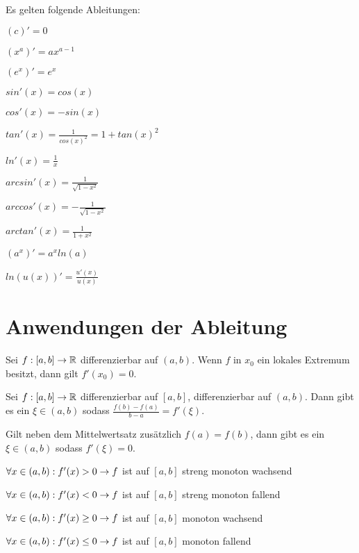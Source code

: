 \begin{satz}
	Es gelten folgende Ableitungen:
	\begin{multicols}{2}
		\begin{description}[noitemsep]
			\item $(c)' = 0$
			\item $(x^a)'=ax^{a-1}$
			\item $(e^x)'=e^x$
			\item $sin'(x) = cos(x)$
			\item $cos'(x) = -sin(x)$
			\item $tan'(x) = \frac{1}{cos(x)^2} = 1 + tan(x)^2$
			\item $ln'(x) = \frac{1}{x}$
			\item $arcsin'(x) = \frac{1}{\sqrt{1 -x^2}}$	
			\item $arccos'(x) = - \frac{1}{\sqrt{1 - x^2}}$	
			\item $arctan'(x) = \frac{1}{1 + x^2}$
			\item $(a^x)' = a^x ln(a)$
			\item $ln(u(x))'=\frac{u'(x)}{u(x)}$
		\end{description}
	\end{multicols}
\end{satz}

\section{Anwendungen der Ableitung}

\begin{satz}
	Sei $f : [a,b] \rightarrow \mathbb{R}$ differenzierbar auf $(a,b)$. Wenn $f$ in $x_0$ ein lokales Extremum besitzt, dann gilt $f'(x_0) = 0$.
\end{satz}

\begin{satz}[Mittelwertsatz]
	Sei $f : [a,b] \rightarrow \mathbb{R}$ differenzierbar auf $[a,b]$, differenzierbar auf $(a,b)$. Dann gibt es ein $\xi \in (a,b)$ sodass $\frac{f(b) - f(a)}{b - a} = f'(\xi)$.
\end{satz}

\begin{satz}
	Gilt neben dem Mittelwertsatz zusätzlich $f(a) = f(b)$, dann gibt es ein $\xi \in (a,b)$ sodass $f'(\xi) = 0$.
\end{satz}

\begin{satz}
	\begin{description}[noitemsep]
		\item $\forall x \in (a,b): f'(x) > 0 \rightarrow f$ ist auf $[a,b]$ streng monoton wachsend
		\item $\forall x \in (a,b): f'(x) < 0 \rightarrow f$ ist auf $[a,b]$ streng monoton fallend
		\item $\forall x \in (a,b): f'(x) \geq 0 \rightarrow f$ ist auf $[a,b]$ monoton wachsend
		\item $\forall x \in (a,b): f'(x) \leq 0 \rightarrow f$ ist auf $[a,b]$ monoton fallend
	\end{description}
\end{satz}

